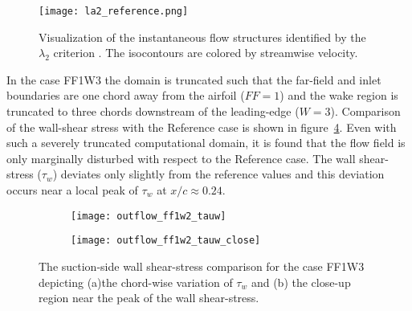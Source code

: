 \begin{figure}[h]
	\centering
	\texttt{[image: la2\_reference.png]}
	\caption{Visualization of the instantaneous flow structures identified by the $\lambda_{2}$ criterion \cite{jeong95}. The isocontours are colored by streamwise velocity.}
	\label{fig:la2_reference}
\end{figure}

In the case FF1W3 the domain is truncated such that the far-field and inlet boundaries are one chord away from the airfoil ($FF=1$) and the wake region is truncated to three chords downstream of the leading-edge ($W=3$). Comparison of the wall-shear stress with the Reference case is shown in figure~\ref{fig:outflow_ff1w3}. Even with such a severely truncated computational domain, it is found that the flow field is only marginally disturbed with respect to the Reference case. The wall shear-stress ($\tau_{w}$) deviates only slightly from the reference values and this deviation occurs near a local peak of $\tau_{w}$ at $x/c\approx0.24$.
\begin{figure}
	\centering
	\begin{subfigure}[h]{0.49\textwidth}
		\centering
		\caption{}		
		\texttt{[image: outflow\_ff1w2\_tauw]}
		\label{fig:outflow_ff1w2_ws}
	\end{subfigure}
	\begin{subfigure}[h]{0.49\textwidth}
		\centering
		\caption{}		
		\texttt{[image: outflow\_ff1w2\_tauw\_close]}
		\label{fig:outflow_ff1w2_ws_close}
	\end{subfigure}
	\caption{The suction-side wall shear-stress comparison for the case FF1W3 depicting (a)the  chord-wise variation of $\tau_{w}$ and (b) the close-up region near the peak of the wall shear-stress.}
	\label{fig:outflow_ff1w3}
\end{figure}

